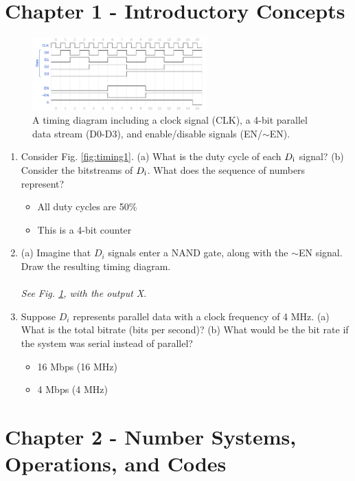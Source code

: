 \documentclass[10pt]{article}
\begin{document}
\maketitle

\section{Chapter 1 - Introductory Concepts}
\begin{figure}[ht]
\centering
\includegraphics[width=0.6\textwidth]{timingExample7a.pdf}
\caption{\label{fig:timing7} A timing diagram including a clock signal (CLK), a 4-bit parallel data stream (D0-D3), and enable/disable signals (EN/$\sim$EN).}
\end{figure}
\begin{enumerate}
\item Consider Fig. \ref{fig:timing1}. (a) What is the duty cycle of each $D_{\rm i}$ signal? (b) Consider the bitstreams of $D_{\rm i}$.  What does the sequence of numbers represent?
\begin{itemize}
\item All duty cycles are 50\%
\item This is a 4-bit counter
\end{itemize}
\item (a) Imagine that $D_i$ signals enter a NAND gate, along with the $\sim$EN signal.  Draw the resulting timing diagram. \\ \\
\textit{See Fig. \ref{fig:timing7}, with the output X}.
\item Suppose $D_i$ represents parallel data with a clock frequency of 4 MHz.  (a) What is the total bitrate (bits per second)?  (b) What would be the bit rate if the system was serial instead of parallel?
\begin{itemize}
\item 16 Mbps (16 MHz)
\item 4 Mbps (4 MHz)
\end{itemize}
\end{enumerate}

\section{Chapter 2 - Number Systems, Operations, and Codes}
\end{document}
